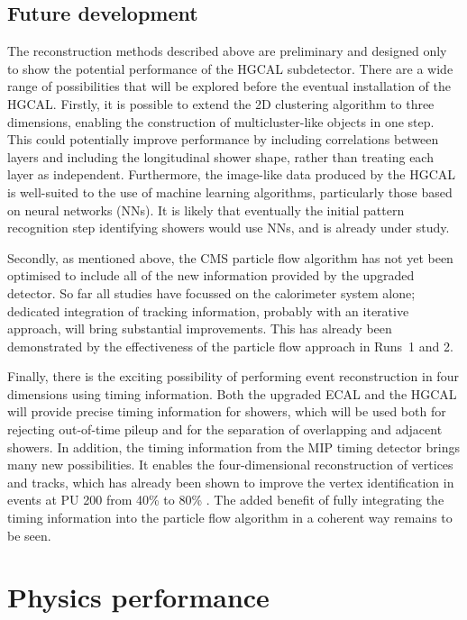 \subsection{Future development}
The reconstruction methods described above are preliminary and designed only to show the potential performance of the HGCAL subdetector.
There are a wide range of possibilities that will be explored before the eventual installation of the HGCAL.
Firstly, it is possible to extend the 2D clustering algorithm to three dimensions, enabling the construction of multicluster-like objects in one step.
This could potentially improve performance by including correlations between layers and including the longitudinal shower shape, 
rather than treating each layer as independent.
Furthermore, the image-like data produced by the HGCAL is well-suited to the use of machine learning algorithms, particularly those based on neural networks (NNs).
It is likely that eventually the initial pattern recognition step identifying showers would use NNs, and is already under study.

Secondly, as mentioned above, the CMS particle flow algorithm has not yet been optimised to include all of the new information provided by the upgraded detector.
So far all studies have focussed on the calorimeter system alone; dedicated integration of tracking information, 
probably with an iterative approach, will bring substantial improvements.
This has already been demonstrated by the effectiveness of the particle flow approach in Runs~1 and 2.

Finally, there is the exciting possibility of performing event reconstruction in four dimensions using timing information.
Both the upgraded ECAL and the HGCAL will provide precise timing information for showers, 
which will be used both for rejecting out-of-time pileup and for the separation of overlapping and adjacent showers.
In addition, the timing information from the MIP timing detector brings many new possibilities. 
It enables the four-dimensional reconstruction of vertices and tracks, 
which has already been shown to improve the vertex identification in \Hgg events at PU 200 from 40\% to 80\% \cite{MTD}.
The added benefit of fully integrating the timing information into the particle flow algorithm in a coherent way remains to be seen.

\section{Physics performance}
\label{sec:hgcal_physics}

